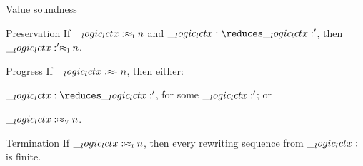\begin{theorem}
  \leavevmode
  \begin{thmdescription}
  \item[Value soundness]

  \item[Preservation]
    If $\__logic_lctx: \approx\sb{\text{\normalfont\scshape i}} n$ and $\lctx \reduces \lctx'$, then $\__logic_lctx:' \approx\sb{\text{\normalfont\scshape i}} n$.

  \item[Progress]
    If $\__logic_lctx: \approx\sb{\text{\normalfont\scshape i}} n$, then either:
    \begin{itemize*}
    \item $\lctx \reduces \lctx'$, for some $\__logic_lctx:'$; or
    \item $\__logic_lctx: \approx\sb{\text{\normalfont\scshape v}} n$.
    \end{itemize*}

  \item[Termination]
    If $\__logic_lctx: \approx\sb{\text{\normalfont\scshape i}} n$, then every rewriting sequence from $\__logic_lctx:$ is finite.
  \end{thmdescription}
\end{theorem}




